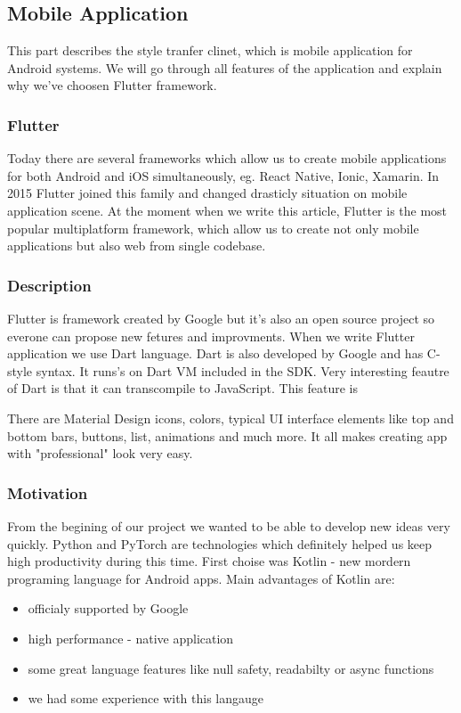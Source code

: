 \documentclass[../Main.tex]{subfiles}
\begin{document}
\newpage
\subsection{Mobile Application}
    This part describes the style tranfer clinet, which is mobile application 
    for Android systems. We will go through all features of the application and
    explain why we've choosen Flutter framework. 
    \subsubsection{Flutter}
        Today there are several frameworks which allow us to create mobile 
        applications for both Android and iOS simultaneously, 
        eg. React Native, Ionic, Xamarin.
        In 2015 Flutter joined this family and changed drasticly situation
        on mobile application scene. At the moment when we write this article,
        Flutter is the most popular multiplatform framework, which allow us to 
        create not only mobile applications but also web from single codebase.
    
    \subsubsection{Description}
        Flutter is framework created by Google but it's also an open source project 
        so everone can propose new fetures and improvments. 
        When we write Flutter application we use Dart language.
        Dart is also developed by Google and has C-style syntax.
        It runs's on Dart VM included in the SDK. 
        Very interesting feautre of Dart is that it can transcompile to JavaScript.
        This feature is 
    
    There are Material Design 
        icons, colors, typical UI interface elements like top and bottom bars,
        buttons, list, animations and much more. 
        It all makes creating app with "professional" look very easy.
        
        
    \subsubsection{Motivation}
        From the begining of our project we wanted to be able to develop new ideas
        very quickly.
        Python and PyTorch are technologies which definitely helped us keep high
        productivity during this time. First choise was Kotlin - new mordern programing 
        language for Android apps. Main advantages of Kotlin are:
            \begin{itemize}
                \item officialy supported by Google
                \item high performance - native application
                \item some great language features like null safety, readabilty or async functions
                \item we had some experience with this langauge
            \end{itemize}
            
\end{document}
